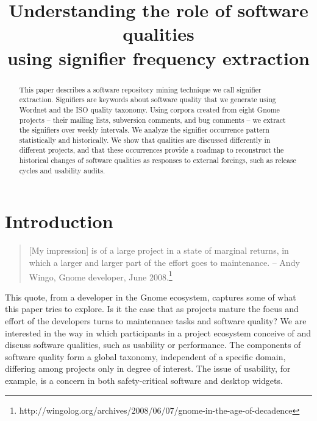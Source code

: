 \documentclass[conference, compsoc]{IEEEtran}
\begin{document}

 
\title{Understanding the role of software qualities\\ using signifier frequency extraction}

\author{
}

\maketitle

\begin{abstract}
This paper describes a software repository mining technique we call signifier extraction. Signifiers are keywords about software quality that we generate using Wordnet and the ISO quality taxonomy. Using corpora created from eight Gnome projects -- their mailing lists, subversion comments, and bug comments -- we extract the signifiers over weekly intervals. We analyze the signifier occurrence pattern statistically and historically. We show that qualities are discussed differently in different projects, and that these occurrences provide a roadmap to reconstruct the historical changes of software qualities as responses to external forcings, such as release cycles and usability audits. 
\end{abstract}
\vspace{-2mm}
\section{Introduction}\label{sect:introduction}%
\vspace{-2mm}
\begin{quote}[My impression] is of a large project in a state of marginal returns, in which a larger and larger part of the effort goes to maintenance. -- Andy Wingo, Gnome developer, June 2008.\footnote{http://wingolog.org/archives/2008/06/07/gnome-in-the-age-of-decadence}\end{quote}
	This quote, from a developer in the Gnome ecosystem, captures some of what this paper tries to explore. Is it the case that as projects mature the focus and effort of the developers turns to maintenance tasks and software quality? 
We are interested in the way in which participants in a project ecosystem conceive of and discuss software qualities, such as usability or performance. The components of software quality form a global taxonomy, independent of a specific domain, differing among projects only in degree of interest. The issue of usability, for example, is a concern in both safety-critical software and desktop widgets. 
\end{document}
